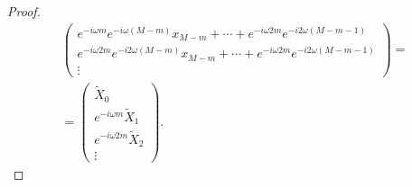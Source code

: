 \begin{proof}
\begin{eqnarray}
\begin{pmatrix}
e^{-i \omega m } e^{-i \omega \left( M - m \right) } x_{M - m} + 
\cdots + 
e^{-i \omega 2 m } e^{-i 2 \omega \left( M - m - 1\right) }\\ 
e^{-i \omega 2 m } e^{-i 2 \omega \left( M - m \right) } x_{M - m} + 
\cdots + 
e^{-i \omega 2 m } e^{-i 2 \omega \left( M - m - 1\right) }\\ 
\vdots 
\end{pmatrix} = 
\nonumber \\
= 
\begin{pmatrix}
\tilde{X}_0 \\
e^{-i \omega m} \tilde{X}_1 \\
e^{-i \omega 2 m} \tilde{X}_2 \\
\vdots  
\end{pmatrix}.
\nonumber
\end{eqnarray}
\end{proof}

